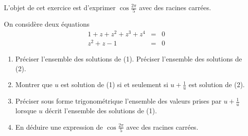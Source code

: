 L'objet de cet exercice est d'exprimer $\cos \frac{2\pi}{5}$ avec des racines carrées.


On considère deux équations
\begin{eqnarray}
1+z+z^2+z^3+z^4 &=& 0\\
z^2+z-1 &=& 0
\end{eqnarray}
\begin{enumerate}
\item Préciser l'ensemble des solutions de (1). Préciser l'ensemble des solutions de (2).
\item Montrer que $u$ est solution de (1) si et seulement si $u+\frac{1}{u}$ est solution de (2).
\item Préciser sous forme trigonométrique l'ensemble des valeurs prises par $u+\frac{1}{u}$ lorsque $u$ décrit l'ensemble des solutions de (1).
\item En déduire une expression de $\cos \frac{2\pi}{5}$ avec des racines carrées.
\end{enumerate}